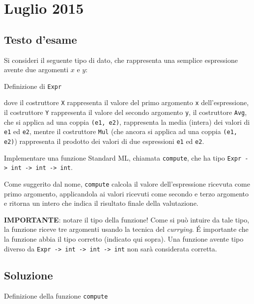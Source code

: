 \section{Luglio 2015}

\subsection{Testo d'esame}

Si consideri il seguente tipo di dato, che rappresenta una semplice espressione avente due argomenti \(x\) e \(y\):

\begin{listing}[!h]
\caption{Definizione di \texttt{Expr}}
\end{listing}

dove il costruttore \texttt{X} rappresenta il valore del primo argomento \texttt{x} dell'espressione,
il costruttore \texttt{Y} rappresenta il valore del secondo argomento \texttt{y},
il costruttore \texttt{Avg}, che si applica ad una coppia \texttt{(e1, e2)}, rappresenta la media (intera) dei valori di \texttt{e1} ed \texttt{e2},
mentre il costruttore \texttt{Mul} (che ancora si applica ad una coppia \texttt{(e1, e2)}) rappresenta il prodotto dei valori di due espressioni \texttt{e1} ed \texttt{e2}.

\medskip
Implementare una funzione Standard ML, chiamata \texttt{compute}, che ha tipo \texttt{Expr -> int -> int -> int}.

\medskip
Come suggerito dal nome, \texttt{compute} calcola il valore dell'espressione ricevuta come primo argomento, applicandola ai valori ricevuti come secondo e terzo argomento e ritorna un intero che indica il risultato finale della valutazione.

\medskip
\textbf{IMPORTANTE}: notare il tipo della funzione! Come si può intuire da tale tipo, la funzione riceve tre argomenti usando la tecnica del \emph{currying}. \'E importante che la funzione abbia il tipo corretto (indicato qui sopra). Una funzione avente tipo diverso da \texttt{Expr -> int -> int -> int} non sarà considerata corretta.

\subsection{Soluzione}

\begin{listing}[!h]
\caption{Definizione della funzione \texttt{compute}}
\end{listing}

